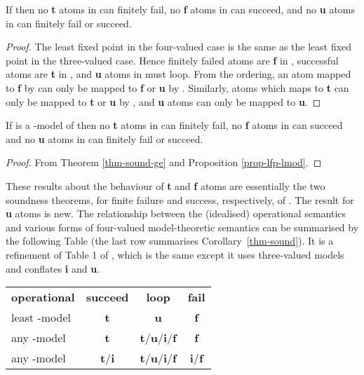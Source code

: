 \documentclass{tlp}
\begin{document}
\begin{theorem} \rm
\label{thm-sound-ge}
If  then no \textbf{t} atoms in  can
finitely fail, no \textbf{f} atoms in  can succeed, and no \textbf{u}
atoms in  can finitely fail or succeed.  
\end{theorem}
\begin{proof}
The least fixed point in the four-valued case is the same as
the least fixed point in the three-valued case.
Hence \cite{Kunen87}
finitely failed atoms are \textbf{f} in , 
successful atoms are \textbf{t} in ,
and \textbf{u} atoms in  must loop.
From the  ordering, an atom mapped to \textbf{f} by  
can only be mapped to \textbf{f} or \textbf{u} by .
Similarly, atoms which  maps to \textbf{t} can only be 
mapped to \textbf{t} or \textbf{u} by , and \textbf{u} 
atoms can only be mapped to \textbf{u}.
\end{proof}

\begin{corollary} \rm
\label{thm-sound}
If  is a -model of  then no \textbf{t} atoms in  can
finitely fail, no \textbf{f} atoms in  can succeed and no \textbf{u}
atoms in  can finitely fail or succeed.  
\end{corollary}
\begin{proof}
From Theorem \ref{thm-sound-ge} and Proposition \ref{prop-lfp-lmod}.
\end{proof}
These results about the behaviour of \textbf{t} and \textbf{f} atoms are
essentially the two soundness theorems, for finite failure and success,
respectively, of .  The result for \textbf{u} atoms is new.
The relationship between the (idealised) operational semantics and various
forms of four-valued model-theoretic semantics can be summarised by
the following Table (the last row summarises Corollary~\ref{thm-sound}).
It is a refinement of Table 1 of , which is the same except
it uses three-valued models and conflates \textbf{i} and \textbf{u}.
\medskip

\begin{center}
\begin{tabular}{|l|c|c|c|}
\cline{1-4}
\textbf{operational} & \textbf{succeed} & \textbf{loop} & \textbf{fail} \\
\cline{1-4}
least -model & \textbf{t} & \textbf{u} & \textbf{f} \\
\cline{1-4}
any -model & \textbf{t} &
		\textbf{t}/\textbf{u}/\textbf{i}/\textbf{f} & \textbf{f} \\
\cline{1-4}
any -model & \textbf{t}/\textbf{i} &
		\textbf{t}/\textbf{u}/\textbf{i}/\textbf{f} & \textbf{i}/\textbf{f} \\
\cline{1-4}
\cline{1-4}
\end{tabular}
\end{center}
\end{document}
